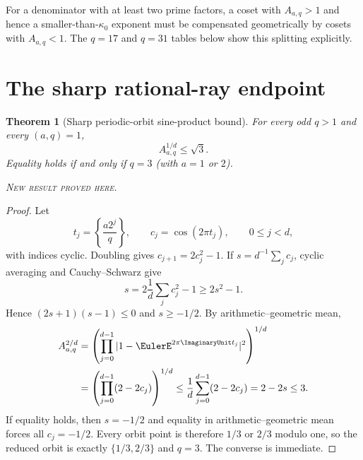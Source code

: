 \documentclass[11pt,oneside]{article}
\newtheorem{theorem}{Theorem}[section]
\theoremstyle{definition}
\theoremstyle{remark}
\newcommand{\newresult}{\textcolor{newgreen}{\textsc{New result proved here.}}}
\begin{document}
\begin{remark}
For a denominator with at least two prime factors, a coset with $A_{a,q}>1$ and
hence a smaller-than-$\kappa_0$ exponent must be compensated geometrically by
cosets with $A_{a,q}<1$. The $q=17$ and $q=31$ tables below show this splitting
explicitly.
\end{remark}

\section{The sharp rational-ray endpoint}\label{p2:sec:sharp-endpoint}

\begin{theorem}[Sharp periodic-orbit sine-product bound]\label{p2:thm:sqrt3-bound}
For every odd $q>1$ and every $(a,q)=1$,
\begin{equation}
 \boxed{A_{a,q}^{1/d}\le\sqrt3.}
 \label{p2:eq:sqrt3-bound}
\end{equation}
Equality holds if and only if $q=3$ (with $a=1$ or $2$).

\smallskip\noindent\newresult
\end{theorem}

\begin{proof}
Let
\[
 t_j=\left\{\frac{a2^j}{q}\right\},\qquad
 c_j=\cos(2\pi t_j),\qquad0\le j<d,
\]
with indices cyclic. Doubling gives $c_{j+1}=2c_j^2-1$. If
$s=d^{-1}\sum_jc_j$, cyclic averaging and Cauchy--Schwarz give
\[
 s=2\frac1d\sum_jc_j^2-1\ge2s^2-1.
\]
Hence $(2s+1)(s-1)\le0$ and $s\ge-1/2$. By arithmetic--geometric mean,
\begin{align*}
 A_{a,q}^{2/d}
 &=\left(\prod_{j=0}^{d-1}|1-\EulerE^{2\pi\ImaginaryUnit t_j}|^2\right)^{1/d}\\
 &=\left(\prod_{j=0}^{d-1}(2-2c_j)\right)^{1/d}
 \le\frac1d\sum_{j=0}^{d-1}(2-2c_j)
 =2-2s\le3.
\end{align*}
If equality holds, then $s=-1/2$ and equality in arithmetic--geometric mean forces
all $c_j=-1/2$. Every orbit point is therefore $1/3$ or $2/3$ modulo one, so the
reduced orbit is exactly $\{1/3,2/3\}$ and $q=3$. The converse is immediate.
\end{proof}
\end{document}
